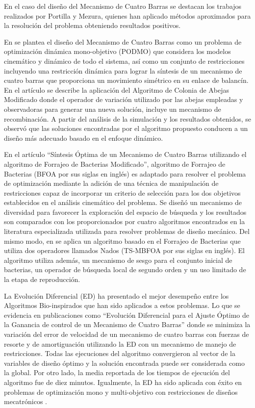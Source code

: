 En el caso del  diseño del Mecanismo de Cuatro Barras se destacan los trabajos realizados por Portilla y Mezura, quienes han aplicado métodos aproximados para la resolución del problema obteniendo resultados positivos. 

 En \cite{portilla-flores_dynamic_nodate} se plantea el diseño del Mecanismo de Cuatro Barras como un problema de optimización dinámica mono-objetivo (PODMO) que considera los modelos cinemático y dinámico de todo el sistema, así como un conjunto de restricciones incluyendo una restricción dinámica para lograr la síntesis de un mecanismo de cuatro barras que proporciona un movimiento simétrico en su enlace de balancín. En el artículo se describe la aplicación del Algoritmo de Colonia de Abejas Modificado donde el operador de variación utilizado por las abejas empleadas y observadoras para generar una nueva solución, incluye un mecanismo de recombinación. A partir del análisis de la simulación y los resultados obtenidos, se observó que las soluciones encontradas por el algoritmo propuesto conducen a un diseño más adecuado basado en el enfoque dinámico.


En el artículo ``Síntesis Óptima de un Mecanismo de Cuatro Barras utilizando el algoritmo de Forrajeo de Bacterias Modificado'', algoritmo de Forrajeo de Bacterias (BFOA por sus siglas en inglés) es adaptado para resolver el problema de optimización mediante la adición de una técnica de manipulación de restricciones capaz de incorporar un criterio de selección para los dos objetivos establecidos en el análisis cinemático del problema. Se diseñó un mecanismo de diversidad para favorecer la exploración del espacio de búsqueda y los resultados son comparados con los proporcionados por cuatro algoritmos encontrados en la literatura especializada utilizada para resolver problemas de diseño mecánico\cite{mezura-montes_optimum_2014}. Del mismo modo, en \cite{herne1_two_swim_2016} se aplica un algoritmo basado en el Forrajeo de Bacterias que utiliza dos operadores llamados Nados (TS-MBFOA por sus siglas en inglés). El algoritmo utiliza además, un mecanismo de sesgo para el conjunto inicial de bacterias, un operador de búsqueda local de segundo orden y un uso limitado de la etapa de reproducción.
  
La Evolución Diferencial (ED) ha presentado el mejor desempeño entre los Algoritmos Bio-inspirados que han sido aplicados a estos problemas. Lo que se evidencia en publicaciones como ``Evolución Diferencial para el Ajuste Óptimo de la Ganancia de control de un Mecanismo de Cuatro Barras'' donde se minimiza la variación del error de velocidad de un mecanismo de cuatro barras con fuerzas de resorte y de amortiguación utilizando la ED con un mecanismo de manejo de restricciones. Todas las ejecuciones del algoritmo convergieron al vector de la variables de diseño óptimo y la solución encontrada puede ser considerada como la global. Por otro lado, la media reportada de los tiempos de ejecución  del algoritmo fue de diez minutos. Igualmente, la ED ha sido aplicada con éxito en problemas de optimización mono y multi-objetivo con restricciones de diseños mecatrónicos \cite{portilla-flores_integration_2007} \cite{villarreal-cervantes_control_2013}.
  
